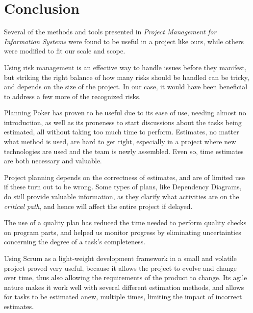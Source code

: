 \section{Conclusion}

Several of the methods and tools presented in \emph{Project Management for
Information Systems}\cite{caye} were found to be useful in a project like ours,
while others were modified to fit our scale and scope.

Using risk management is an effective way to handle issues before they
manifest, but striking the right balance of how many risks should be handled
can be tricky, and depends on the size of the project. In our case, it would
have been beneficial to address a few more of the recognized risks.

Planning Poker has proven to be useful due to its ease of use, needing
almost no introduction, as well as its proneness to start discussions about the
tasks being estimated, all without taking too much time to perform.
Estimates, no matter what method is used, are hard to get right, especially
in a project where new technologies are used and the team is newly assembled.
Even so, time estimates are both necessary and valuable.

Project planning depends on the correctness of estimates, and are of limited use
if these turn out to be wrong. Some types of plans, like Dependency Diagrams, do
still provide valuable information, as they clarify what activities are on the
\emph{critical path}, and hence will affect the entire project if delayed.

The use of a quality plan has reduced the time needed to perform quality checks
on program parts, and helped us monitor progress by eliminating uncertainties
concerning the degree of a task's completeness.

Using Scrum as a light-weight development framework in a small and volatile
project proved very useful, because it allows the project to evolve and change
over time, thus also allowing the requirements of the product to change. Its
agile nature makes it work well with several different estimation methods, and
allows for tasks to be estimated anew, multiple times, limiting the impact of
incorrect estimates.

